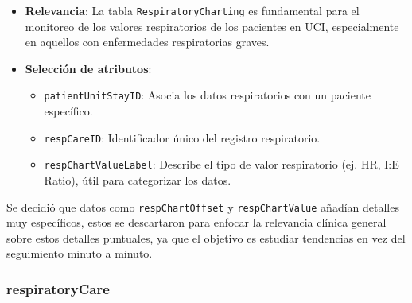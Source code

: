\documentclass[12pt, a4paper, twoside]{article}
\begin{document}
	\begin{itemize}
		\item \textbf{Relevancia}: La tabla \texttt{RespiratoryCharting} es fundamental para el monitoreo de los valores respiratorios de los pacientes en UCI, especialmente en aquellos con enfermedades respiratorias graves.
		
		\item \textbf{Selección de atributos}:
		\begin{itemize}
			\item \texttt{patientUnitStayID}: Asocia los datos respiratorios con un paciente específico.
			\item \texttt{respCareID}: Identificador único del registro respiratorio.
			\item \texttt{respChartValueLabel}: Describe el tipo de valor respiratorio (ej. HR, I:E Ratio), útil para categorizar los datos.
		\end{itemize}
		
	\end{itemize}
	
	Se decidió que datos como \texttt{respChartOffset} y \texttt{respChartValue} añadían detalles muy específicos, estos se descartaron para enfocar la relevancia clínica general sobre estos detalles puntuales, ya que el objetivo es estudiar tendencias en vez del seguimiento minuto a minuto.\cite{eICU2024}
	
	\subsubsection{respiratoryCare}
	
\end{document}

